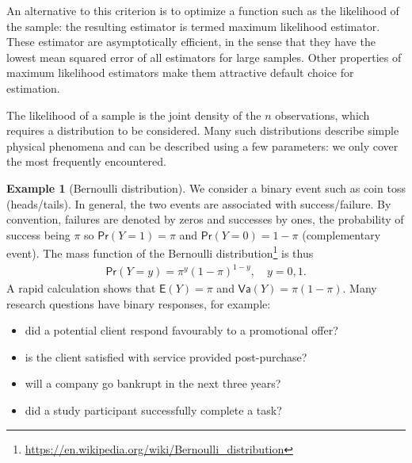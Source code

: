 \documentclass[
  11pt,
  letterpaper,
]{book}
\providecommand{\tightlist}{%
  \setlength{\itemsep}{0pt}\setlength{\parskip}{0pt}}
\renewcommand{\href}[2]{#2\footnote{\url{#1}}}
\theoremstyle{definition}
\theoremstyle{definition}
\newtheorem{example}{Example}[chapter]
\theoremstyle{definition}
\theoremstyle{remark}
\begin{document}
An alternative to this criterion is to optimize a function such as the likelihood of the sample: the resulting estimator is termed maximum likelihood estimator. These estimator are asymptotically efficient, in the sense that they have the lowest mean squared error of all estimators for large samples. Other properties of maximum likelihood estimators make them attractive default choice for estimation.

The likelihood of a sample is the joint density of the \(n\) observations, which requires a distribution to be considered. Many such distributions describe simple physical phenomena and can be described using a few parameters: we only cover the most frequently encountered.

\begin{example}[Bernoulli distribution]
\protect\hypertarget{exm:bernoullidist}{}{\label{exm:bernoullidist} {} }We consider a binary event such as coin toss (heads/tails). In general, the two events are associated with success/failure. By convention, failures are denoted by zeros and successes by ones, the probability of success being \(\pi\) so \(\mathsf{Pr}(Y=1)=\pi\) and \(\mathsf{Pr}(Y=0)=1-\pi\) (complementary event). The mass function of the \href{https://en.wikipedia.org/wiki/Bernoulli_distribution}{Bernoulli distribution} is thus
\begin{align*}
\mathsf{Pr}(Y=y) = \pi^y (1-\pi)^{1-y}, \quad y=0, 1.
\end{align*}
A rapid calculation shows that \(\mathsf{E}(Y)=\pi\) and \(\mathsf{Va}(Y)=\pi(1-\pi)\).
Many research questions have binary responses, for example:

\begin{itemize}
\tightlist
\item
  did a potential client respond favourably to a promotional offer?
\item
  is the client satisfied with service provided post-purchase?
\item
  will a company go bankrupt in the next three years?
\item
  did a study participant successfully complete a task?
\end{itemize}
\end{example}
\end{document}
